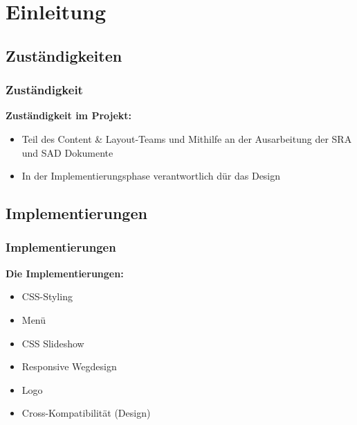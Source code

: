 \section{Einleitung} %
\subsection{Zust\"andigkeiten} %
\begin{frame} %
 \frametitle{Zuständigkeit} %
\textbf{Zuständigkeit im Projekt:}
 \begin{itemize}
\bigskip

\item Teil des Content \& Layout-Teams und Mithilfe an der Ausarbeitung der SRA und SAD Dokumente
\item In der Implementierungsphase verantwortlich dür das Design


 \end{itemize}

\end{frame}


\subsection{Implementierungen}
\begin{frame} %
\frametitle{Implementierungen} %

\textbf{Die Implementierungen:}
\bigskip

  \begin{itemize}

      \item CSS-Styling
      \item Menü
      \item CSS Slideshow
      \item Responsive Wegdesign
      \item Logo
     \item Cross-Kompatibilität (Design)

  \end{itemize}

\end{frame}
